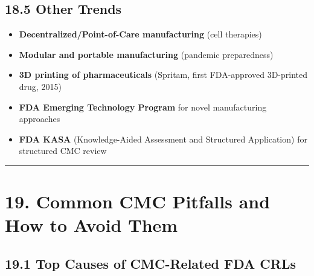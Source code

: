 \documentclass[
  11pt,
  a4paper,
]{report}
\providecommand{\tightlist}{%
  \setlength{\itemsep}{0pt}\setlength{\parskip}{0pt}}
\begin{document}
\hypertarget{other-trends}{%
\subsection{18.5 Other Trends}\label{other-trends}}

\begin{itemize}
\tightlist
\item
  \textbf{Decentralized/Point-of-Care manufacturing} (cell therapies)
\item
  \textbf{Modular and portable manufacturing} (pandemic preparedness)
\item
  \textbf{3D printing of pharmaceuticals} (Spritam, first FDA-approved
  3D-printed drug, 2015)
\item
  \textbf{FDA Emerging Technology Program} for novel manufacturing
  approaches
\item
  \textbf{FDA KASA} (Knowledge-Aided Assessment and Structured
  Application) for structured CMC review
\end{itemize}

\begin{center}\rule{0.5\linewidth}{0.5pt}\end{center}

\hypertarget{common-cmc-pitfalls-and-how-to-avoid-them}{%
\section{19. Common CMC Pitfalls and How to Avoid
Them}\label{common-cmc-pitfalls-and-how-to-avoid-them}}

\hypertarget{top-causes-of-cmc-related-fda-crls}{%
\subsection{19.1 Top Causes of CMC-Related FDA
CRLs}\label{top-causes-of-cmc-related-fda-crls}}
\end{document}
